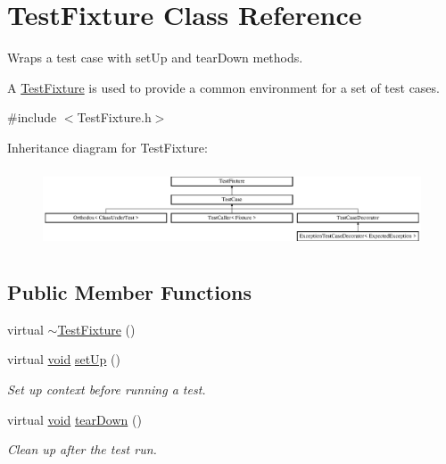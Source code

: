 \hypertarget{class_test_fixture}{\section{Test\-Fixture Class Reference}
\label{class_test_fixture}
}


Wraps a test case with set\-Up and tear\-Down methods.

A \hyperlink{class_test_fixture}{Test\-Fixture} is used to provide a common environment for a set of test cases.  




{\ttfamily \#include $<$Test\-Fixture.\-h$>$}

Inheritance diagram for Test\-Fixture\-:\begin{figure}[H]
\begin{center}
\leavevmode
\includegraphics[height=2.370370cm]{class_test_fixture}
\end{center}
\end{figure}
\subsection*{Public Member Functions}
\begin{DoxyCompactItemize}
\item 
virtual \hyperlink{class_test_fixture_a3ac71cd5a494f2ed4c5b15fdbb426c8b}{$\sim$\-Test\-Fixture} ()
\item 
virtual \hyperlink{wglew_8h_aeea6e3dfae3acf232096f57d2d57f084}{void} \hyperlink{class_test_fixture_a0e77590b14a3ec7f93fe02e5b89a242f}{set\-Up} ()
\begin{DoxyCompactList}\small\item\em Set up context before running a test. \end{DoxyCompactList}\item 
virtual \hyperlink{wglew_8h_aeea6e3dfae3acf232096f57d2d57f084}{void} \hyperlink{class_test_fixture_a707dd4d7d0910af916343d79c0feffc9}{tear\-Down} ()
\begin{DoxyCompactList}\small\item\em Clean up after the test run. \end{DoxyCompactList}\end{DoxyCompactItemize}


